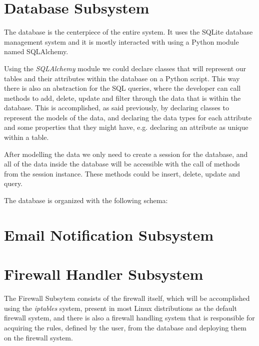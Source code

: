 \section{Database Subsystem}
\label{chap4:sec:db-sys}
The database is the centerpiece of the entire system. It uses the SQLite
database management system and it is mostly interacted with using a Python
module named SQLAlchemy.

Using the \emph{SQLAlchemy} module we could declare classes that will represent
our tables and their attributes within the database on a Python script. This
way there is also an abstraction for the SQL queries, where the developer can
call methods to add, delete, update and filter through the data that is within
the database. This is accomplished, as said previously, by declaring classes to
represent the models of the data, and declaring the data types for each
attribute and some properties that they might have, e.g. declaring an attribute
as unique within a table.


After modelling the data we only need to create a session for the database, and
all of the data inside the database will be accessible with the call of methods
from the session instance. These methods could be insert, delete, update and
query.



The database is organized with the following schema:


\section{Email Notification Subsystem}
\label{chap4:sec:email-sys}

\section{Firewall Handler Subsystem}
\label{chap4:sec:firewall-sys}
The Firewall Subsytem consists of the firewall itself, which will be
accomplished using the \emph{iptables} system, present in most Linux
distributions as the default firewall system, and there is also a firewall
handling system that is responsible for acquiring the rules, defined by the
user, from the database and deploying them on the firewall system.

